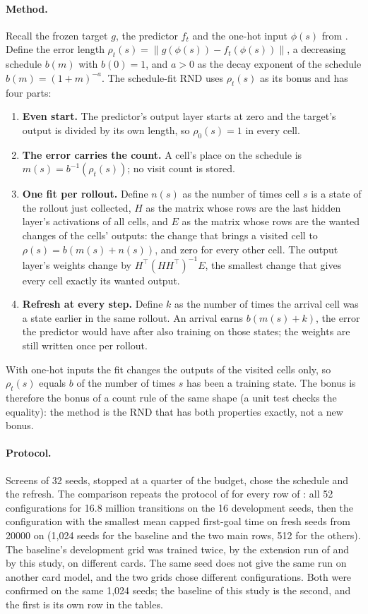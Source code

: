 \paragraph{Method.}
Recall the frozen target $g$, the predictor $f_t$ and the one-hot input $\phi(s)$ from
. Define the error length
$\rho_t(s)=\lVert g(\phi(s))-f_t(\phi(s))\rVert$, a decreasing schedule $b(m)$ with $b(0)=1$, and
$a>0$ as the decay exponent of the schedule $b(m)=(1+m)^{-a}$. The schedule-fit RND uses
$\rho_t(s)$ as its bonus and has four parts:
\begin{enumerate}[leftmargin=*]
\item \textbf{Even start.} The predictor's output layer starts at zero and the target's output is
divided by its own length, so $\rho_0(s)=1$ in every cell.
\item \textbf{The error carries the count.} A cell's place on the schedule is
$m(s)=b^{-1}(\rho_t(s))$; no visit count is stored.
\item \textbf{One fit per rollout.} Define $n(s)$ as the number of times cell $s$ is a state of
the rollout just collected, $H$ as the matrix whose rows are the last hidden layer's activations
of all cells, and $E$ as the matrix whose rows are the wanted changes of the cells' outputs: the
change that brings a visited cell to $\rho(s)=b(m(s)+n(s))$, and zero for every other cell. The
output layer's weights change by $H^{\top}(HH^{\top})^{-1}E$, the smallest change that gives every
cell exactly its wanted output.
\item \textbf{Refresh at every step.} Define $k$ as the number of times the arrival cell was a
state earlier in the same rollout. An arrival earns $b(m(s)+k)$, the error the predictor would
have after also training on those states; the weights are still written once per rollout.
\end{enumerate}
With one-hot inputs the fit changes the outputs of the visited cells only, so $\rho_t(s)$ equals
$b$ of the number of times $s$ has been a training state. The bonus is therefore the bonus of a
count rule of the same shape (a unit test checks the equality): the method is the RND that has
both properties exactly, not a new bonus.

\paragraph{Protocol.}
Screens of 32 seeds, stopped at a quarter of the budget, chose the schedule and the refresh. The
comparison repeats the protocol of  for every row of
: all 52 configurations for 16.8 million transitions on the 16
development seeds, then the configuration with the smallest mean capped first-goal time on fresh
seeds from 20000 on (1,024 seeds for the baseline and the two main rows, 512 for the others).
The baseline's development grid was trained twice, by the extension run of
 and by this study, on different cards. The same seed does not give
the same run on another card model, and the two grids chose different configurations. Both were
confirmed on the same 1,024 seeds; the baseline of this study is the second, and the first is
its own row in the tables.

